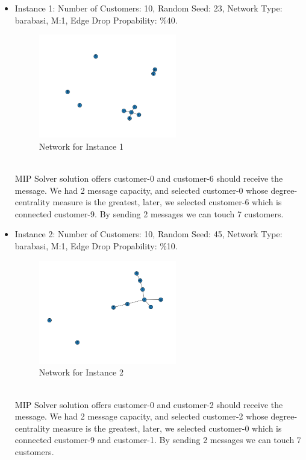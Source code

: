 \documentclass[11pt]{article}
\begin{document}
\begin{itemize}
\item Instance 1: Number of Customers: 10, Random Seed: 23, Network Type: barabasi, M:1, Edge Drop Propability: \%40.
\\
\begin{figure}[htp]
    \centering
    \includegraphics[width=6cm]{micro_world_case_1}
    \caption{Network for Instance 1}
    \label{fig:fig_micro_world_case_1}
\end{figure}
\\
MIP Solver solution offers customer-0 and customer-6 should receive the message.
We had 2 message capacity, and selected customer-0 whose degree-centrality measure is the greatest, later, we selected customer-6 which is connected customer-9. By sending 2 messages we can touch 7 customers.
\\
\item Instance 2: Number of Customers: 10, Random Seed: 45, Network Type: barabasi, M:1, Edge Drop Propability: \%10.
\\
\begin{figure}[htp]
    \centering
    \includegraphics[width=6cm]{micro_world_case_2}
    \caption{Network for Instance 2}
    \label{fig:fig_micro_world_case_2}
\end{figure}
\\
MIP Solver solution offers customer-0 and customer-2 should receive the message.
We had 2 message capacity, and selected customer-2 whose degree-centrality measure is the greatest, later, we selected customer-0 which is connected customer-9 and customer-1. By sending 2 messages we can touch 7 customers.

\end{itemize}
\end{document}
